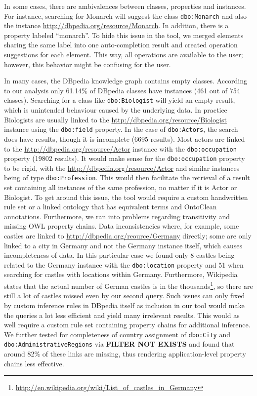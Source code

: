 \documentclass{sig-alternate}
\begin{document}
In some cases, there are ambivalences between classes, properties and instances. For instance, searching for Monarch will suggest the class \Verb+dbo:Monarch+ and also the instance \url{http://dbpedia.org/resource/Monarch}. In addition, there is a property labeled ``monarch''. To hide this issue in the tool, we merged elements sharing the same label into one auto-completion result and created operation suggestions for each element. This way, all operations are available to the user; however, this behavior might be confusing for the user.

In many cases, the DBpedia knowledge graph contains empty classes. According to our analysis only 61.14\% of DBpedia classes have instances (461 out of 754 classes). Searching for a class like \Verb+dbo:Biologist+ will yield an empty result, which is unintended behaviour caused by the underlying data. In practice Biologists are usually linked to the \url{http://dbpedia.org/resource/Biologist} instance using the \Verb+dbo:field+ property. In the case of \Verb+dbo:Actors+, the search does have results, though it is incomplete (6695 results). Most actors are linked to the \url{http://dbpedia.org/resource/Actor} instance with the \Verb+dbo:occupation+ property (19802 results). It would make sense for the \Verb+dbo:occupation+ property to be rigid, with the \url{http://dbpedia.org/resource/Actor} and similar instances being of type \Verb+dbo:Profession+. This would then facilitate the retrieval of a result set containing all instances of the same profession, no matter if it is Actor or Biologist. To get around this issue, the tool would require a custom handwritten rule set or a linked ontology that has equivalent terms and OntoClean annotations. Furthermore, we ran into problems regarding transitivity and missing OWL property chains. Data inconsistencies where, for example, some castles are linked to \url{http://dbpedia.org/reource/Germany} directly; some are only linked to a city in Germany and not the Germany instance itself, which causes incompleteness of data. In this particular case we found only 8 castles being related to the Germany instance with the \Verb+dbo:location+ property and 51 when searching for castles with locations within Germany. Furthermore, Wikipedia states that the actual number of German castles is in the thousands\footnote{\url{http://en.wikipedia.org/wiki/List\_of\_castles\_in\_Germany}}, so there are still a lot of castles missed even by our second query. Such issues can only ﬁxed by custom inference rules in DBpedia itself as inclusion in our tool would make the queries a lot less eﬃcient and yield many irrelevant results. This would as well require a custom rule set containing property chains for additional inference. We further tested for completeness of country assignment of \Verb+dbo:City+ and \Verb+dbo:AdministrativeRegions+ via {\bf FILTER NOT EXISTS} and found that around 82\% of these links are missing, thus rendering application-level property chains less eﬀective.
\end{document}
